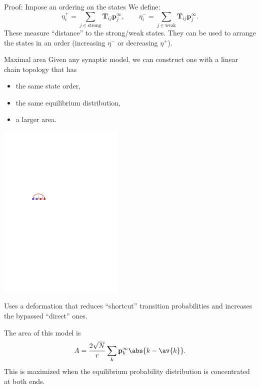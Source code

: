 \documentclass[final,hyperref={pdfpagelabels=false,bookmarks=false}]{beamer}
\newcommand{\eq}{\mathbf{p}^\infty}
\newcommand{\fpt}{\mathbf{T}}
\begin{document}
\begin{frame}{}
\begin{columns}[t]
\begin{column}{0.37\linewidth}
\begin{block}{Proof: Impose an ordering on the states}
 \vp We define:
 \begin{equation*}
   \eta^+_i = \sum_{j\in\text{strong}} \fpt_{ij} \eq_j,
   \qquad
   \eta^-_i = \sum_{j\in\text{weak}} \fpt_{ij} \eq_j.
 \end{equation*}
 These measure ``distance'' to the strong/weak states.
 They can be used to arrange the states in an order (increasing $\eta^-$ or decreasing $\eta^+$).
%
\end{block}


\begin{block}{Maximal area}
%
 Given any synaptic model, we can construct one with a linear chain topology that has
 \parbox[c]{15cm}{
  \begin{itemize}
    \item the same state order,
    \item the same equilibrium distribution,
    \item a larger area.
  \end{itemize}
 }
 \parbox[c]{15cm}{
  \begin{center}
    \includegraphics[width=6cm]{shortcut.svg}
  \end{center}
 }

 Uses a deformation that reduces ``shortcut'' transition probabilities and increases the bypassed ``direct'' ones.

 \vp The area of this model is
 \begin{equation*}
   A = \frac{2\sqrt{N}}{r}\sum_k \eq_k \abs{k-\av{k}}.
 \end{equation*}
 This is maximized when the equilibrium probability distribution is concentrated at both ends.
%
\end{block}






\end{column}
\end{columns}
\end{frame}
\end{document}
